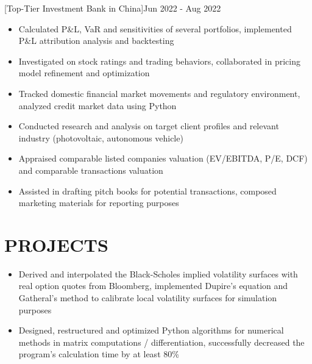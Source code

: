 \documentclass[cmu]{resume}
\begin{document}
    [Top-Tier Investment Bank in China]{Jun 2022 - Aug 2022}
    \begin{itemize}
        \item Calculated P\&L, VaR and sensitivities of several portfolios, implemented P\&L attribution analysis and backtesting
        \item Investigated on stock ratings and trading behaviors, collaborated in pricing model refinement and optimization
        \item Tracked domestic financial market movements and regulatory environment, analyzed credit market data using Python
    \end{itemize}

    \begin{itemize}
        \item Conducted research and analysis on target client profiles and relevant industry (photovoltaic, autonomous vehicle)
        \item Appraised comparable listed companies valuation (EV/EBITDA, P/E, DCF) and comparable transactions valuation
        \item Assisted in drafting pitch books for potential transactions, composed marketing materials for reporting purposes
    \end{itemize}
    \section{PROJECTS}
    \begin{itemize}
        \item Derived and interpolated the Black-Scholes implied volatility surfaces with real option quotes from Bloomberg, implemented Dupire's equation and Gatheral's method to calibrate local volatility surfaces for simulation purposes
        \item Designed, restructured and optimized Python algorithms for numerical methods in matrix computations / differentiation, successfully decreased the program's calculation time by at least 80\%
    \end{itemize}
\end{document}
